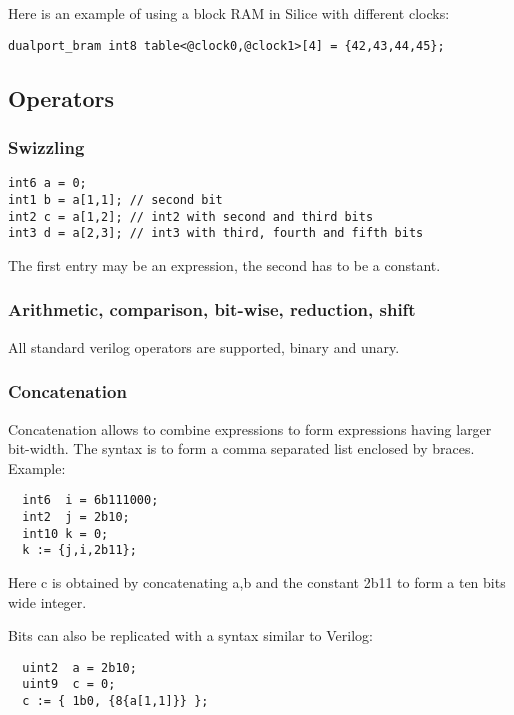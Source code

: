 \documentclass[a4]{article}
\newcommand\silice{Silice}
\begin{document}
Here is an example of using a block RAM in \silice{} with different clocks:

\begin{verbatim}
dualport_bram int8 table<@clock0,@clock1>[4] = {42,43,44,45};
\end{verbatim}

\subsection{Operators}

\subsubsection{Swizzling}

\begin{verbatim}
int6 a = 0;
int1 b = a[1,1]; // second bit
int2 c = a[1,2]; // int2 with second and third bits
int3 d = a[2,3]; // int3 with third, fourth and fifth bits
\end{verbatim}

The first entry may be an expression, the second has to be a constant.

\subsubsection{Arithmetic, comparison, bit-wise, reduction, shift}

All standard verilog operators are supported, binary and unary.

\subsubsection{Concatenation}

Concatenation allows to combine expressions to form expressions having larger bit-width.
The syntax is to form a comma separated list enclosed by braces.  Example:
\begin{verbatim}
  int6  i = 6b111000;
  int2  j = 2b10;
  int10 k = 0;
  k := {j,i,2b11};
\end{verbatim}

Here c is obtained by concatenating a,b and the constant 2b11 to form a ten bits wide integer.

Bits can also be replicated with a syntax similar to Verilog:

\begin{verbatim}
  uint2  a = 2b10;
  uint9  c = 0;
  c := { 1b0, {8{a[1,1]}} };
\end{verbatim}
\end{document}
